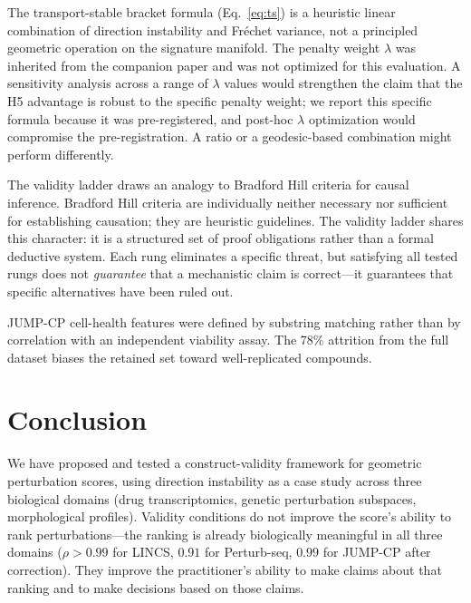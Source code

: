 \documentclass[10pt]{article}
\begin{document}
The transport-stable bracket formula (Eq.~\ref{eq:ts}) is a heuristic
linear combination of direction instability and Fr\'echet variance, not a
principled geometric operation on the signature manifold. The penalty
weight $\lambda$ was inherited from the companion paper
\citep{tower2026drug} and was not optimized for this evaluation. A
sensitivity analysis across a range of $\lambda$ values would strengthen
the claim that the H5 advantage is robust to the specific penalty
weight; we report this specific formula because it was pre-registered,
and post-hoc $\lambda$ optimization would compromise the pre-registration.
A ratio or a geodesic-based combination might perform differently.

The validity ladder draws an analogy to Bradford Hill criteria for causal
inference. Bradford Hill criteria are individually neither necessary nor
sufficient for establishing causation; they are heuristic guidelines. The
validity ladder shares this character: it is a structured set of proof
obligations rather than a formal deductive system. Each rung eliminates
a specific threat, but satisfying all tested rungs does not
\emph{guarantee} that a mechanistic claim is correct---it guarantees
that specific alternatives have been ruled out.

JUMP-CP cell-health features were defined by substring matching rather
than by correlation with an independent viability assay. The 78\% attrition
from the full dataset biases the retained set toward well-replicated
compounds.

\section{Conclusion}

We have proposed and tested a construct-validity framework for geometric
perturbation scores, using direction instability as a case study across
three biological domains (drug transcriptomics, genetic perturbation
subspaces, morphological profiles). Validity conditions do not improve the
score's ability to rank perturbations---the ranking is already biologically
meaningful in all three domains ($\rho > 0.99$ for LINCS, $0.91$ for
Perturb-seq, $0.99$ for JUMP-CP after correction). They improve the
practitioner's ability to make claims about that ranking and to make
decisions based on those claims.
\end{document}
